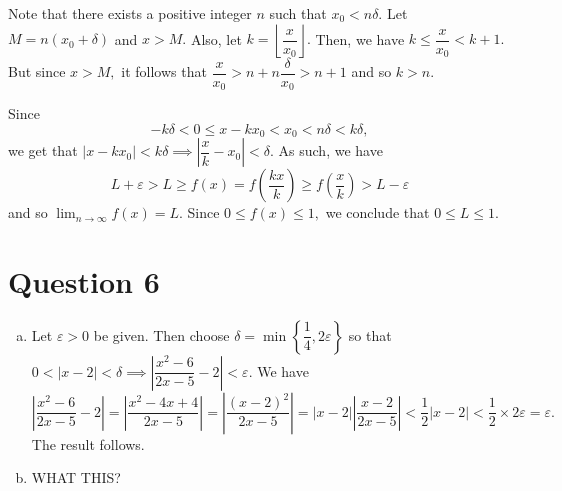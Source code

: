 \documentclass{article}
\begin{document}
\begin{enumerate}[(a)]
    Note that there exists a positive integer $n$ such that $x_0<n\delta.$ Let $M=n(x_0+\delta)$ and $x>M.$ Also, let $k=\left\lfloor\dfrac{x}{x_0}\right\rfloor.$ Then, we have $k\leq \dfrac{x}{x_0}<k+1.$ But since $x>M,$ it follows that $\dfrac{x}{x_0}>n+n\dfrac{\delta}{x_0}>n+1$ and so $k>n.$
    
    Since $$-k\delta<0\leq x-kx_0<x_0<n\delta<k\delta,$$
    we get that $|x-kx_0|<k\delta\implies \left|\dfrac{x}{k}-x_0\right|<\delta.$ As such, we have $$L+\varepsilon>L\geq f(x)=f\left(\frac{kx}{k}\right)\geq f\left(\frac{x}{k}\right)>L-\varepsilon$$ and so $\displaystyle\lim_{n\to\infty}f(x)=L.$ Since $0\leq f(x)\leq 1,$ we conclude that $0\leq L\leq 1.$
\end{enumerate}
\section*{Question 6}
\begin{enumerate}[(a)]
        \item Let $\varepsilon>0$ be given. Then choose $\delta=\min\left\{\dfrac{1}{4},2\varepsilon\right\}$ so that $0<|x-2|<\delta\implies\left|\dfrac{x^2-6}{2x-5}-2\right|<\varepsilon.$ We have
        $$\left|\dfrac{x^2-6}{2x-5}-2\right|=\left|\frac{x^2-4x+4}{2x-5}\right|=
        \left|\frac{(x-2)^2}{2x-5}\right|=|x-2|\left|\frac{x-2}{2x-5}\right|<\frac{1}{2}|x-2|<\frac{1}{2}\times2\varepsilon=\varepsilon.$$
        The result follows.
        \item WHAT THIS?
\end{enumerate}
\end{document}
